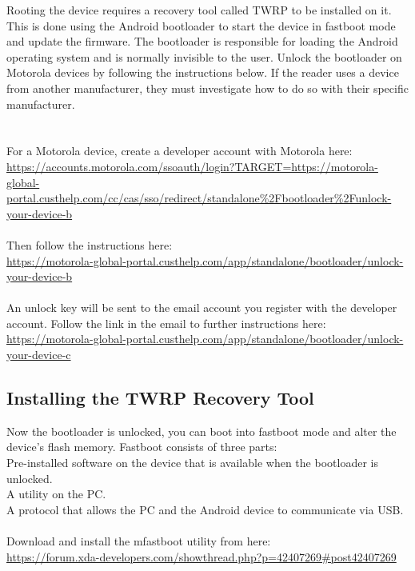 Rooting the device requires a recovery tool called TWRP to be installed on it.  This is done using the Android bootloader to start the device in fastboot mode and update the firmware.  The bootloader is responsible for loading the Android operating system and is normally invisible to the user.  Unlock the bootloader on Motorola devices by following the instructions below.  If the reader uses a device from another manufacturer, they must investigate how to do so with their specific manufacturer.\\
\\
\\
For a Motorola device, create a developer account with Motorola here:\\
\url{https://accounts.motorola.com/ssoauth/login?TARGET=https://motorola-global-portal.custhelp.com/cc/cas/sso/redirect/standalone\%2Fbootloader\%2Funlock-your-device-b}\\
\\
Then follow the instructions here:\\
\url{https://motorola-global-portal.custhelp.com/app/standalone/bootloader/unlock-your-device-b}\\
\\
An unlock key will be sent to the email account you register with the developer account.  Follow the link in the email to further instructions here:\\
\url{https://motorola-global-portal.custhelp.com/app/standalone/bootloader/unlock-your-device-c}

\subsection{Installing the TWRP Recovery Tool}
\label{sec:Installing the recovery tool}

Now the bootloader is unlocked, you can boot into fastboot mode and alter the device's flash memory.  Fastboot consists of three parts:\\
Pre-installed software on the device that is available when the bootloader is unlocked.\\
A utility on the PC.\\
A protocol that allows the PC and the Android device to communicate via USB.\\
\\
Download and install the mfastboot utility from here:\\
\url{https://forum.xda-developers.com/showthread.php?p=42407269#post42407269}\\


